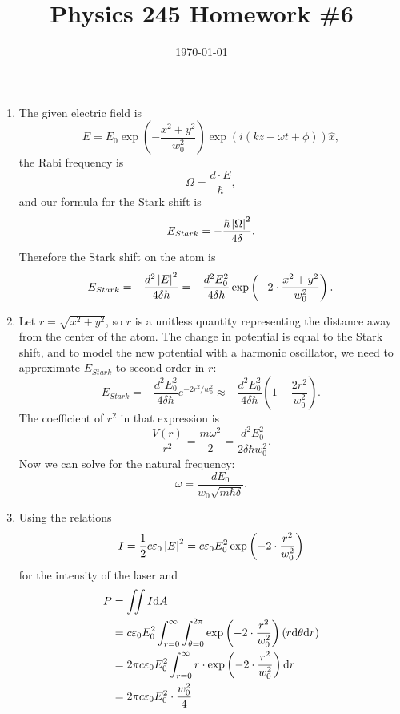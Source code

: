 \documentclass{article}
\date{\today}
\title{Physics 245 Homework \#6}
\begin{document}
\maketitle

\begin{prob}
\end{prob}
\begin{enumerate}[label=(\alph*)]
    \item The given electric field is
        \[ E = E_0 \exp \left( - \frac{x^2+y^2}{w_0^2} \right) \exp \left( i (kz-\omega t + \phi) \right) \hat{x}, \]
        the Rabi frequency is
        \[ \Omega = \frac{d\cdot E}{\hbar}, \]
        and our formula for the Stark shift is
        \[ E_{Stark} = - \frac{\hbar \left\lvert \Omega \right\rvert^2}{4 \delta}. \]
        Therefore the Stark shift on the atom is
        \[ E_{Stark} = - \frac{d^2 \left\lvert E \right\rvert^2}{4 \delta \hbar} = - \frac{d^2 E_0^2}{4 \delta \hbar} \exp \left( -2 \cdot \frac{x^2 + y^2}{w_0^2} \right). \]
    \item Let $r = \sqrt{x^2+y^2}$, so $r$ is a unitless quantity representing the distance away from the center of the atom. The change in potential is equal to the Stark shift, and to model the new potential with a harmonic oscillator, we need to approximate $E_{Stark}$ to second order in $r$:
        \[ E_{Stark} = - \frac{d^2 E_0^2}{4 \delta \hbar} e^{-2r^2/w_0^2} \approx - \frac{d^2 E_0^2}{4 \delta \hbar} \left( 1 - \frac{2r^2}{w_0^2} \right).  \]
        The coefficient of $r^2$ in that expression is
        \[ \frac{V(r)}{r^2} = \frac{m\omega^2}{2} = \frac{d^2 E_0^2}{2 \delta \hbar w_0^2}. \]
        Now we can solve for the natural frequency:
        \[ \omega = \frac{d E_0}{w_0 \sqrt{m \hbar \delta}}. \]
    \item Using the relations
        \[ I = \frac{1}{2} c \varepsilon_0 \left\lvert E \right\rvert^2 = c \varepsilon_0 E_0^2 \exp \left( -2 \cdot \frac{r^2}{w_0^2} \right)  \]
        for the intensity of the laser and
        \begin{align*}
            P &= \iint I \d A \\
              &= c \varepsilon_0 E_0^2 \int_{r=0}^\infty \int_{\theta=0}^{2\pi} \exp \left( -2 \cdot \frac{r^2}{w_0^2} \right) \left( r \d \theta \d r \right)  \\
              &= 2 \pi c \varepsilon_0 E_0^2 \int_{r=0}^\infty r \cdot \exp \left( -2 \cdot \frac{r^2}{w_0^2} \right) \d r  \\
              &= 2 \pi c \varepsilon_0 E_0^2 \cdot \frac{w_0^2}{4} \\

\end{align*}
\end{enumerate}
\end{document}
